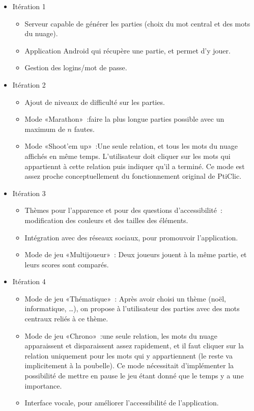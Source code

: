 \documentclass[a4paper,11pt,french]{article}
\def\android{Android\texttrademark{}}
\begin{document}
\begin{itemize}
\item Itération 1
  \begin{itemize}
  \item Serveur capable de générer les parties (choix du mot central et des mots du nuage).
  \item Application \android{} qui récupère une partie, et permet d'y jouer.
  \item Gestion des logins/mot de passe.
  \end{itemize}
\item Itération 2
  \begin{itemize}
  \item Ajout de niveaux de difficulté sur les parties.
  \item Mode «Marathon»~:faire la plus longue parties possible avec un maximum de $n$ fautes.
  \item Mode «Shoot'em up»~:Une seule relation, et tous les mots du nuage affichés en même temps. L'utilisateur doit cliquer sur les mots
    qui appartiennt à cette relation puis indiquer qu'il a terminé. Ce mode est assez proche conceptuellement du fonctionnement original de
    PtiClic.
  \end{itemize}
\item Itération 3
  \begin{itemize}
  \item Thèmes pour l'apparence et pour des questions d'accessibilité~: modification des couleurs et des tailles des éléments.
  \item Intégration avec des réseaux sociaux, pour promouvoir l'application.
  \item Mode de jeu «Multijoueur»~: Deux joueurs jouent à la même partie, et leurs scores sont comparés.
  \end{itemize}
\item Itération 4
  \begin{itemize}
  \item Mode de jeu «Thématique»~: Après avoir choisi un thème (noël, informatique, \dots), on propose à l'utilisateur des parties avec des
    mots centraux reliés à ce thème.
  \item Mode de jeu «Chrono»~:une seule relation, les mots du nuage apparaissent et disparaissent assez rapidement, et il faut cliquer sur
    la relation uniquement pour les mots qui y appartiennent (le reste va implicitement à la poubelle). Ce mode nécessitait d'implémenter la
    possibilité de mettre en pause le jeu étant donné que le temps y a une importance.
  \item Interface vocale, pour améliorer l'accessibilité de l'application.
  \end{itemize}
\end{itemize}
\end{document}
